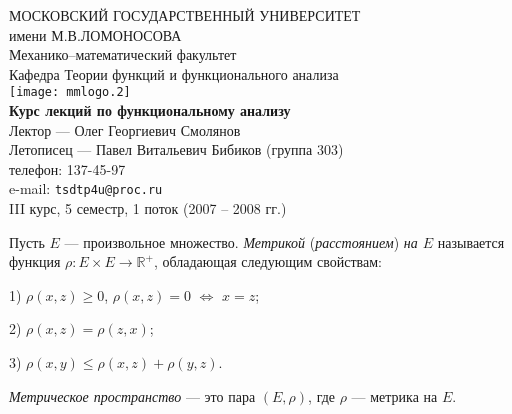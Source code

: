 \documentclass[10pt,titlepage, a4paper]{article}
\begin{document}
\begin{titlepage}
\begin{center}
\vspace*{-20pt}
\textsf{%
{\Large МОСКОВСКИЙ ГОСУДАРСТВЕННЫЙ УНИВЕРСИТЕТ \\%
\vspace{5pt}%
имени М.В.ЛОМОНОСОВА}\\%
\vspace{25pt} %
{\Large Механико--математический факультет}\\%
\vspace{15pt} %
{\large Кафедра Теории функций и функционального анализа\\}%
\vspace{40pt}%
\texttt{[image: mmlogo.2]}\\ %
\vspace{40pt}%
{\LARGE\textbf{Курс лекций по функциональному анализу\\} }%
\vspace{25pt} %
Лектор --- Олег Георгиевич Смолянов\\ %
\vspace{20pt}%
Летописец --- Павел Витальевич Бибиков (группа 303)\\
телефон: 137-45-97\\
e-mail: {\normalfont \verb"tsdtp4u@proc.ru"}\\
\vspace{40pt}}%
III курс, 5 семестр, 1 поток (2007 -- 2008 гг.)
\end{center}
\end{titlepage}
\lecture

\vspace{-25pt}


\begin{defen}
Пусть $E$ --- произвольное множество. \emph{Метрикой}
(\emph{расстоянием}) \emph{на $E$} называется функция $\rho\colon
E\times E\to \mathbb{R}^+$, обладающая следующим свойствам:

1) $\rho(x,z)\geqslant 0$, $\rho(x,z)=0$ $\Leftrightarrow$ $x=z$;

2) $\rho(x,z)=\rho(z,x)$;

3) $\rho(x,y)\leqslant\rho(x,z)+\rho(y,z)$.

\emph{Метрическое пространство} --- это пара $(E,\rho)$, где $\rho$
--- метрика на $E$.
\end{defen}
\end{document}

